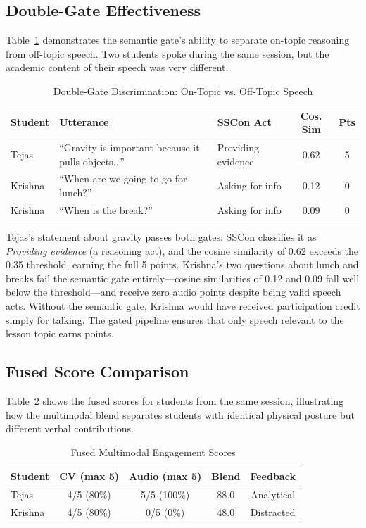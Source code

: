 \documentclass[conference]{IEEEtran}
\begin{document}
\subsection{Double-Gate Effectiveness}
Table~\ref{tab:gate_demo} demonstrates the semantic gate's ability to separate on-topic reasoning from off-topic speech. Two students spoke during the same session, but the academic content of their speech was very different.
\begin{table}[htbp]
\caption{Double-Gate Discrimination: On-Topic vs. Off-Topic Speech}
\begin{center}
\setlength{\tabcolsep}{3pt}
\begin{tabular}{|p{1.05cm}|p{1.95cm}|p{1.4cm}|c|c|}
\hline
\textbf{Student} & \textbf{Utterance} & \textbf{SSCon Act} & \textbf{Cos. Sim} & \textbf{Pts} \\
\hline
Tejas & ``Gravity is important because it pulls objects...'' & Providing evidence & 0.62 & 5 \\
\hline
Krishna & ``When are we going to go for lunch?'' & Asking for info & 0.12 & 0 \\
\hline
Krishna & ``When is the break?'' & Asking for info & 0.09 & 0 \\
\hline
\end{tabular}
\label{tab:gate_demo}
\end{center}
\end{table}

Tejas's statement about gravity passes both gates: SSCon classifies it as \emph{Providing evidence} (a reasoning act), and the cosine similarity of 0.62 exceeds the 0.35 threshold, earning the full 5 points. Krishna's two questions about lunch and breaks fail the semantic gate entirely---cosine similarities of 0.12 and 0.09 fall well below the threshold---and receive zero audio points despite being valid speech acts. Without the semantic gate, Krishna would have received participation credit simply for talking. The gated pipeline ensures that only speech relevant to the lesson topic earns points.

\subsection{Fused Score Comparison}
Table~\ref{tab:fused} shows the fused scores for students from the same session, illustrating how the multimodal blend separates students with identical physical posture but different verbal contributions.

\begin{table}[htbp]
\caption{Fused Multimodal Engagement Scores}
\begin{center}
\begin{tabular}{|l|c|c|c|c|}
\hline
\textbf{Student} & \textbf{CV (max 5)} & \textbf{Audio (max 5)} & \textbf{Blend} & \textbf{Feedback} \\
\hline
Tejas & 4/5 (80\%) & 5/5 (100\%) & 88.0 & Analytical \\
\hline
Krishna & 4/5 (80\%) & 0/5 (0\%) & 48.0 & Distracted \\
\hline
\end{tabular}
\label{tab:fused}
\end{center}
\end{table}
\end{document}
